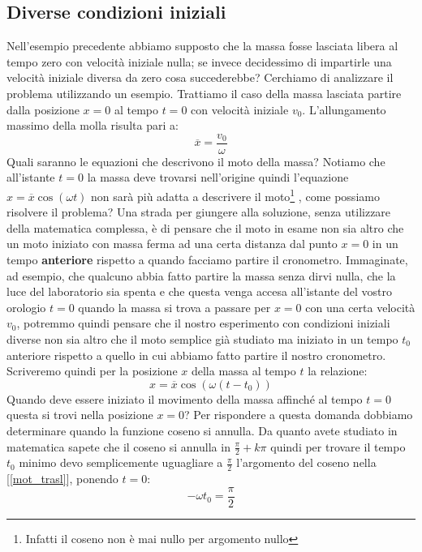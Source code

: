 \documentclass[a4paper,10pt,oneside]{article}
\begin{document}
\subsection*{Diverse condizioni iniziali}
Nell'esempio precedente abbiamo supposto che la massa fosse lasciata libera al tempo zero con velocità iniziale nulla; se invece decidessimo di impartirle una velocità iniziale diversa da zero cosa succederebbe? Cerchiamo di analizzare il problema utilizzando un esempio. Trattiamo il caso della massa lasciata partire dalla posizione $x=0$ al tempo $t=0$ con velocità iniziale $v_0$.
L'allungamento massimo della molla risulta pari a:
\begin{equation}
 \overline x=\frac{v_0}{\omega}
\end{equation}
Quali saranno le equazioni che descrivono il moto della massa? Notiamo che all'istante $t=0$ la massa deve trovarsi nell'origine quindi l'equazione $x=\overline x\cos(\omega t)$ non sarà più adatta a descrivere il moto\footnote{Infatti il coseno non è mai nullo per argomento nullo} , come possiamo risolvere il problema? Una strada per giungere alla soluzione, senza utilizzare della matematica complessa, è di pensare che il moto in esame non sia altro che un moto iniziato con massa ferma ad una certa distanza dal punto $x=0$ in un tempo \textbf{anteriore} rispetto a quando facciamo partire il cronometro. Immaginate, ad esempio, che qualcuno abbia fatto partire la massa senza dirvi nulla, che la luce del laboratorio sia spenta e che questa venga accesa all'istante del vostro orologio $t=0$  quando la massa si trova a passare per $x=0$ con una certa velocità $v_0$, potremmo quindi pensare che il nostro esperimento con condizioni iniziali diverse non sia altro che il moto semplice già studiato ma iniziato in un tempo $t_0$ anteriore rispetto a quello in cui abbiamo fatto partire il nostro cronometro.
Scriveremo quindi per la posizione $x$ della massa al tempo $t$ la relazione:
\begin{equation}\label{mot_trasl}
 x=\overline x\cos(\omega(t-t_0))
\end{equation}
Quando deve essere iniziato il movimento della massa affinché al tempo $t=0$ questa si trovi nella posizione $x=0$? Per rispondere a questa domanda dobbiamo determinare quando la funzione coseno si annulla. Da quanto avete studiato in matematica sapete che il coseno si annulla in $\frac \pi 2 +k\pi$ quindi per trovare il tempo $t_0$ minimo devo semplicemente uguagliare a $\frac \pi 2 $ l'argomento del coseno nella [\ref{mot_trasl}], ponendo $t=0$:
\begin{equation}
 -\omega t_0=\frac \pi 2
\end{equation}
\end{document}
